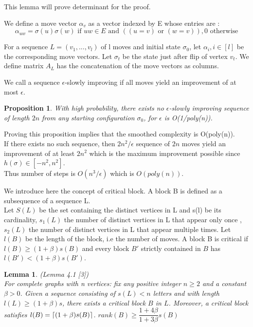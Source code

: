 \documentclass[12pt]{article}
\newtheorem{lemma}[theorem]{Lemma}
\newtheorem{proposition}[theorem]{Proposition}
\DeclarePairedDelimiter{\ceil}{\lceil}{\rceil}
\begin{document}
This lemma will prove determinant for the proof. 

We define a move vector $\alpha_v$ as a vector indexed by E whose entries are :
\begin{equation*}
\alpha_{uw} = \sigma(u)\sigma(w) \text{ if } uw \in E \text{ and }( (u = v) \text{ or } (w = v)), 0 \text{ otherwise}
\end{equation*} 

For a sequence $L = (v_1, ..., v_l)$ of l moves and initial state $\sigma_0$, let $\alpha_i, i \in [l]$ be the corresponding move vectors. Let $\sigma_t$ be the state just after flip of vertex $v_t$. We define matrix $A_L$ has the concatenation of the move vectors as columns.

We call a sequence $\epsilon$-slowly improving if all moves yield an improvement of at most $\epsilon$.

\begin{proposition}
\label{prop}
With high probability, there exists no $\epsilon$-slowly improving sequence of length $2n$ from any starting configuration $\sigma_0$, for $\epsilon$ is O(1/poly(n)).
\end{proposition}

Proving this proposition implies that the smoothed complexity is O(poly(n)). \\
If there exists no such sequence, then $2n^2/\epsilon$ sequence of $2n$ moves yield an improvement of at least $2n^2$ which is the maximum improvement possible since $h(\sigma) \in [-n^2,n^2]$. \\
Thus number of steps is $O(n^3/\epsilon)$ which is $O(poly(n))$.

We introduce here the concept of critical block. A block B is defined as a subsequence of a sequence L.\\
Let $S(L)$ be the set containing the distinct vertices in L and s(l) be its cardinality, $s_1(L)$ the number of distinct vertices in L that appear only once , $s_2(L)$ the number of distinct vertices in L that appear multiple times. Let $l(B)$ be the length of the block, i.e the number of moves.
A block B is critical if $l(B) \geq (1 + \beta)s(B)$ and every block $B'$ strictly contained in $B$ has $l(B') < (1+\beta)s(B')$.

\begin{lemma}
\label{critical}
(Lemma 4.1 [3]) \\
For complete graphs with n vertices: fix any positive integer $n \geq 2$ and a constant $\beta > 0$. Given a sequence consisting of $s(L) < n$ letters and with length $l(L) \geq (1 +\beta)s$, there exists a critical block $B$ in $L$. Moreover, a critical block satisfies $l(B) = \ceil{(1 + \beta)s(B)}$.
$rank(B) \geq \dfrac{1+4\beta}{1 + 3\beta}s(B)$
\end{lemma} 
\end{document}
